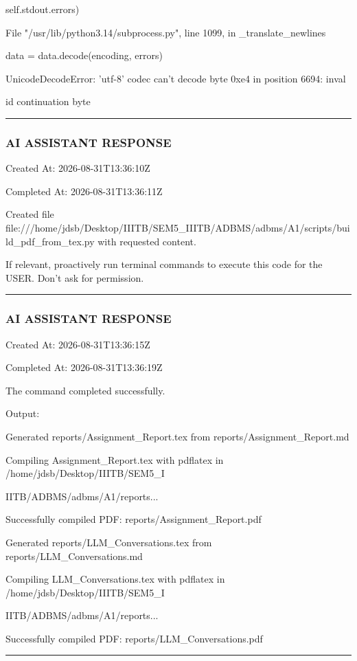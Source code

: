 \documentclass[11pt,a4paper]{article}
\begin{document}
{self.stdout.errors)

File "/usr/lib/python3.14/subprocess.py", line 1099, in \_translate\_newlines

data = data.decode(encoding, errors)

UnicodeDecodeError: 'utf-8' codec can't decode byte 0xe4 in position 6694: inval

id continuation byte


\hrule

\subsubsection{AI ASSISTANT RESPONSE}

Created At: 2026-08-31T13:36:10Z

Completed At: 2026-08-31T13:36:11Z

Created file file:///home/jdsb/Desktop/IIITB/SEM5\_IIITB/ADBMS/adbms/A1/scripts/build\_pdf\_from\_tex.py with requested content.

If relevant, proactively run terminal commands to execute this code for the USER. Don't ask for permission.


\hrule

\subsubsection{AI ASSISTANT RESPONSE}

Created At: 2026-08-31T13:36:15Z

Completed At: 2026-08-31T13:36:19Z


The command completed successfully.

Output:

Generated reports/Assignment\_Report.tex from reports/Assignment\_Report.md

Compiling Assignment\_Report.tex with pdflatex in /home/jdsb/Desktop/IIITB/SEM5\_I

IITB/ADBMS/adbms/A1/reports...

Successfully compiled PDF: reports/Assignment\_Report.pdf

Generated reports/LLM\_Conversations.tex from reports/LLM\_Conversations.md

Compiling LLM\_Conversations.tex with pdflatex in /home/jdsb/Desktop/IIITB/SEM5\_I

IITB/ADBMS/adbms/A1/reports...

Successfully compiled PDF: reports/LLM\_Conversations.pdf


\hrule

}
\end{document}
